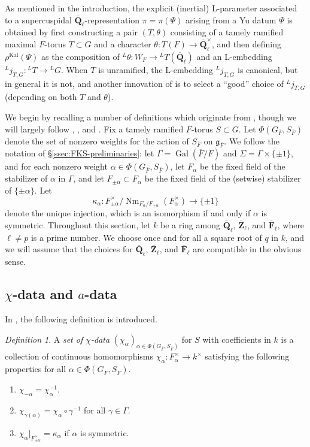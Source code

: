 \documentclass[reqno]{amsart}
\numberwithin{equation}{subsection}
\newcommand{\F}{\mathbf{F}}
\newcommand{\Q}{\mathbf{Q}}
\newcommand{\Z}{\mathbf{Z}}
\newcommand{\Gal}{\operatorname{Gal}}
\newcommand{\ol}[1]{\overline{#1}}
\newcommand{\co}{\colon}
\newcommand{\ld}{{}^L}
\DeclareMathOperator{\Nm}{Nm}
\DeclareMathOperator{\Kal}{Kal}
\theoremstyle{remark}
\newtheorem{defn}[thm]{Definition}
\numberwithin{equation}{subsection}
\numberwithin{figure}{subsection}
\begin{document}
As mentioned in the introduction, the explicit (inertial) L-parameter associated to a supercuspidal $\ol\Q_\ell$-representation $\pi = \pi(\Psi)$ arising from a Yu datum $\Psi$ is obtained by first constructing a pair $(T, \theta)$ consisting of a tamely ramified maximal $F$-torus $T \subset G$ and a character $\theta\co T(F) \to \ol\Q_\ell^\times$, and then defining $\rho^{\Kal}(\Psi)$ as the composition of $\ld\theta\co W_F \to \ld T(\ol\Q_\ell)$ and an L-embedding $\ld j_{T,G}\co \ld T \to \ld G$. When $T$ is unramified, the L-embedding $\ld j_{T,G}$ is canonical, but in general it is not, and another innovation of \cite{FKS23} is to select a ``good'' choice of $\ld j_{T,G}$ (depending on both $T$ and $\theta$).

We begin by recalling a number of definitions which originate from \cite{LS87}, though we will largely follow \cite{Kal19}, \cite{Kal21a}, and \cite{Kal21b}. Fix a tamely ramified $F$-torus $S \subset G$. Let $\Phi(G_{\ol F}, S_{\ol F})$ denote the set of nonzero weights for the action of $S_{\ol F}$ on $\mathfrak{g}_{\ol F}$. We follow the notation of \S\ref{ssec:FKS-preliminaries}: let $\Gamma = \Gal(\ol F/F)$ and $\Sigma = \Gamma \times \{\pm 1\}$, and for each nonzero weight $\alpha \in \Phi(G_{\ol F}, S_{\ol F})$, let $F_\alpha$ be the fixed field of the stabilizer of $\alpha$ in $\Gamma$, and let $F_{\pm\alpha} \subset F_\alpha$ be the fixed field of the (setwise) stabilizer of $\{\pm\alpha\}$. Let
\begin{equation}\label{eq:kappa-alpha}\kappa_\alpha\co F_{\pm\alpha}^\times/\Nm_{F_\alpha/F_{\pm\alpha}}(F_\alpha^\times) \to \{\pm 1\}
\end{equation}
denote the unique injection, which is an isomorphism if and only if $\alpha$ is symmetric. Throughout this section, let $k$ be a ring among $\ol\Q_\ell$, $\ol\Z_\ell$, and $\ol\F_\ell$, where $\ell \neq p$ is a prime number. We choose once and for all a square root of $q$ in $k$, and we will assume that the choices for $\ol\Q_\ell$, $\ol\Z_\ell$, and $\ol\F_\ell$ are compatible in the obvious sense.


\subsection{$\chi$-data and $a$-data} In \cite{LS87}, the following definition is introduced.

\begin{defn}\label{defn:chi-data}
A \textit{set of $\chi$-data} $(\chi_\alpha)_{\alpha \in \Phi(G_{\ol F}, S_{\ol F})}$ for $S$ with coefficients in $k$ is a collection of continuous homomorphisms $\chi_\alpha\co F_\alpha^\times \to k^\times$ satisfying the following properties for all $\alpha \in \Phi(G_{\ol F}, S_{\ol F})$.
\begin{enumerate}
    \item $\chi_{-\alpha} = \chi_\alpha^{-1}$.
    \item $\chi_{\gamma(\alpha)} = \chi_\alpha \circ \gamma^{-1}$ for all $\gamma \in \Gamma$.
    \item $\chi_\alpha|_{F_{\pm\alpha}^\times} = \kappa_\alpha$ if $\alpha$ is symmetric.
\end{enumerate}
\end{defn}
\end{document}
